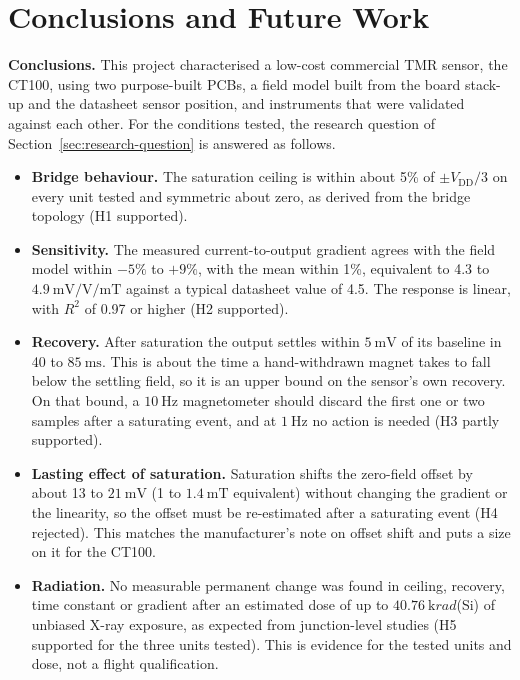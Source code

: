 \documentclass[12pt,a4paper]{article}
\begin{document}
\section{Conclusions and Future Work}
\label{sec:conclusions}

\textbf{Conclusions.} This project characterised a low-cost commercial TMR sensor, the CT100, using two purpose-built PCBs, a field model built from the board stack-up and the datasheet sensor position, and instruments that were validated against each other. For the conditions tested, the research question of Section~\ref{sec:research-question} is answered as follows.
\begin{itemize}
\item \textbf{Bridge behaviour.} The saturation ceiling is within about 5\% of $\pm V_{\text{DD}}/3$ on every unit tested and symmetric about zero, as derived from the bridge topology (H1 supported).
\item \textbf{Sensitivity.} The measured current-to-output gradient agrees with the field model within $-5\%$ to $+9\%$, with the mean within 1\%, equivalent to 4.3 to $\SI{4.9}{\milli\volt\per\volt\per\milli\tesla}$ against a typical datasheet value of 4.5. The response is linear, with $R^2$ of 0.97 or higher (H2 supported).
\item \textbf{Recovery.} After saturation the output settles within $\SI{5}{\milli\volt}$ of its baseline in 40 to $\SI{85}{\milli\second}$. This is about the time a hand-withdrawn magnet takes to fall below the settling field, so it is an upper bound on the sensor's own recovery. On that bound, a $\SI{10}{\hertz}$ magnetometer should discard the first one or two samples after a saturating event, and at $\SI{1}{\hertz}$ no action is needed (H3 partly supported).
\item \textbf{Lasting effect of saturation.} Saturation shifts the zero-field offset by about 13 to $\SI{21}{\milli\volt}$ (1 to $\SI{1.4}{\milli\tesla}$ equivalent) without changing the gradient or the linearity, so the offset must be re-estimated after a saturating event (H4 rejected). This matches the manufacturer's note on offset shift and puts a size on it for the CT100.
\item \textbf{Radiation.} No measurable permanent change was found in ceiling, recovery, time constant or gradient after an estimated dose of up to $\SI{40.76}{\kilo rad}$(Si) of unbiased X-ray exposure, as expected from junction-level studies (H5 supported for the three units tested). This is evidence for the tested units and dose, not a flight qualification.

\end{itemize}
\end{document}
